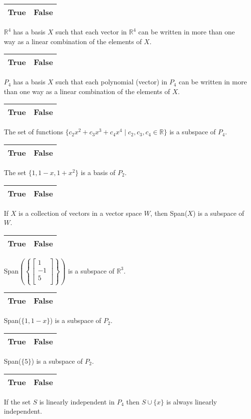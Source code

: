 \documentclass[10pt]{exam}
\begin{document}
\begin{questions}
\begin{choices}
\choice \begin{tabular}{|c|c|}\hline True & False \\ \hline \end{tabular}  $\mathbb{R}^4$ has a basis $X$ such that each vector in  $\mathbb{R}^4$ can be written in more than one way as a linear combination of the elements of $X$.
\choice \begin{tabular}{|c|c|}\hline True & False \\ \hline \end{tabular} $P_4$ has a basis $X$ such that each polynomial (vector) in $P_4$ can be written in more than one way as a linear combination of the elements of $X$.
\choice \begin{tabular}{|c|c|}\hline True & False \\ \hline \end{tabular} The set of functions $\{c_2 x^2 + c_3 x^3 + c_4 x^4 \mid c_2,c_3,c_4 \in \mathbb{R} \}$ is a subspace of $P_4$.
\choice \begin{tabular}{|c|c|}\hline True & False \\ \hline \end{tabular} The set $\{1,1-x,1+x^2\}$ is a basis of $P_2$.
\choice \begin{tabular}{|c|c|}\hline True & False \\ \hline \end{tabular} If $X$ is a collection of vectors in a vector space $W$, then Span($X$) is a subspace of $W$.
\choice \begin{tabular}{|c|c|}\hline True & False \\ \hline \end{tabular} Span$\left(\left \{ \left[ \begin{array}{r} 1 \\ -1 \\ 5\\ \end{array}\right] \right \} \right)$ is a subspace of $\mathbb{R}^3$.
\choice \begin{tabular}{|c|c|}\hline True & False \\ \hline \end{tabular} Span($\{1,1-x\}$) is a subspace of $P_2$.
\choice \begin{tabular}{|c|c|}\hline True & False \\ \hline \end{tabular} Span($\{5\}$) is a subspace of $P_2$.
\choice \begin{tabular}{|c|c|}\hline True & False \\ \hline \end{tabular} If the set $S$ is linearly independent in $P_4$ then $S \cup \{x\}$ is always linearly independent.

\end{choices}
\end{questions}
\end{document}
